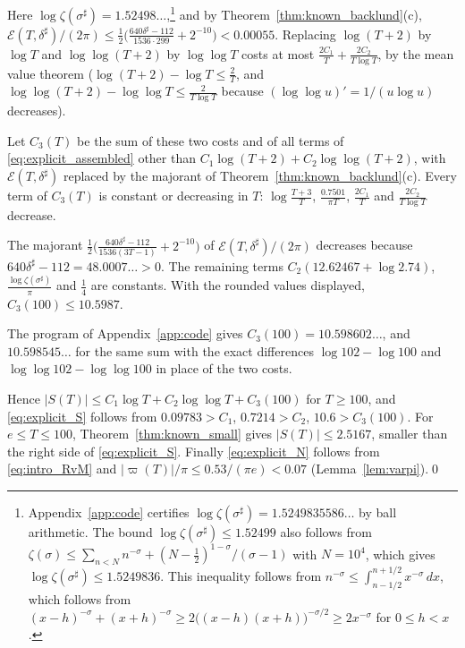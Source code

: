 \documentclass[11pt,a4paper]{article}
\makeatletter
\numberwithin{equation}{section}
\DeclareRobustCommand{\CGref}[1]{\ref{#1}}
\DeclareRobustCommand{\CGeqref}[1]{\eqref{#1}}
\let\CG@origref\ref
\let\CG@origeqref\eqref
\newcommand{\CG@gettip}[1]{\@ifundefined{CGTip@#1}{#1}{\csname CGTip@#1\endcsname}}
\DeclareRobustCommand{\CGref}[1]{\pdftooltip{\CG@origref{#1}}{\CG@gettip{#1}}}
\DeclareRobustCommand{\CGeqref}[1]{\pdftooltip{\CG@origeqref{#1}}{\CG@gettip{#1}}}
\theoremstyle{definition}
\theoremstyle{remark}
\makeatother
\begin{document}
Here $\log\zeta(\sigma^\sharp)=1.52498\ldots$,\footnote{Appendix~\CGref{app:code} certifies $\log\zeta(\sigma^\sharp)=1.5249835586\ldots$ by ball arithmetic. The bound $\log\zeta(\sigma^\sharp)\le1.52499$ also follows from $\zeta(\sigma)\le\sum_{n<N}n^{-\sigma}+(N-\frac12)^{1-\sigma}/(\sigma-1)$ with $N=10^4$, which gives $\log\zeta(\sigma^\sharp)\le1.5249836$. This inequality follows from $n^{-\sigma}\le\int_{n-1/2}^{n+1/2}x^{-\sigma}\,dx$, which follows from $(x-h)^{-\sigma}+(x+h)^{-\sigma}\ge2\bigl((x-h)(x+h)\bigr)^{-\sigma/2}\ge2x^{-\sigma}$ for $0\le h<x$.} and by Theorem~\CGref{thm:known_backlund}(c), $\mathcal E(T,\delta^\sharp)/(2\pi)\le\frac12\bigl(\frac{640\delta^\sharp-112}{1536\cdot299}+2^{-10}\bigr)<0.00055$. Replacing $\log(T+2)$ by $\log T$ and $\log\log(T+2)$ by $\log\log T$ costs at most $\frac{2C_1}T+\frac{2C_2}{T\log T}$, by the mean value theorem ($\log(T+2)-\log T\le\frac2T$, and $\log\log(T+2)-\log\log T\le\frac2{T\log T}$ because $(\log\log u)'=1/(u\log u)$ decreases).

Let $C_3(T)$ be the sum of these two costs and of all terms of \CGeqref{eq:explicit_assembled} other than $C_1\log(T+2)+C_2\log\log(T+2)$, with $\mathcal E(T,\delta^\sharp)$ replaced by the majorant of Theorem~\CGref{thm:known_backlund}(c). Every term of $C_3(T)$ is constant or decreasing in $T$: $\log\frac{T+3}T$, $\frac{0.7501}{\pi T}$, $\frac{2C_1}T$ and $\frac{2C_2}{T\log T}$ decrease.

The majorant $\frac12\bigl(\frac{640\delta^\sharp-112}{1536(3T-1)}+2^{-10}\bigr)$ of $\mathcal E(T,\delta^\sharp)/(2\pi)$ decreases because $640\delta^\sharp-112=48.0007\ldots>0$. The remaining terms $C_2(12.62467+\log2.74)$, $\frac{\log\zeta(\sigma^\sharp)}\pi$ and $\frac14$ are constants. With the rounded values displayed, $C_3(100)\le10.5987$.

The program of Appendix~\CGref{app:code} gives $C_3(100)=10.598602\ldots$, and $10.598545\ldots$ for the same sum with the exact differences $\log102-\log100$ and $\log\log102-\log\log100$ in place of the two costs.

Hence $|S(T)|\le C_1\log T+C_2\log\log T+C_3(100)$ for $T\ge100$, and \CGeqref{eq:explicit_S} follows from $0.09783>C_1$, $0.7214>C_2$, $10.6>C_3(100)$. For $e\le T\le100$, Theorem~\CGref{thm:known_small} gives $|S(T)|\le2.5167$, smaller than the right side of \CGeqref{eq:explicit_S}. Finally \CGeqref{eq:explicit_N} follows from \CGeqref{eq:intro_RvM} and $|\varpi(T)|/\pi\le0.53/(\pi e)<0.07$ (Lemma~\CGref{lem:varpi}).\qed

\end{document}
